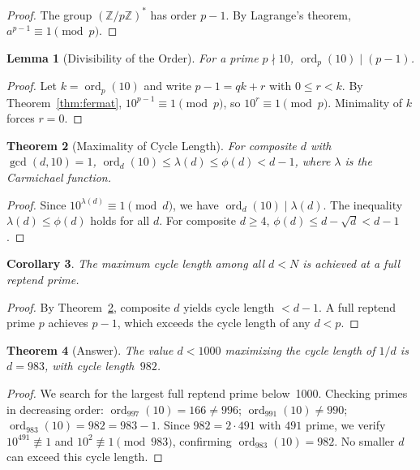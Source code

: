 \documentclass[12pt,a4paper]{article}
\newtheorem{theorem}{Theorem}
\newtheorem{lemma}[theorem]{Lemma}
\newtheorem{corollary}[theorem]{Corollary}
\theoremstyle{definition}
\begin{document}
\begin{proof}
The group $(\mathbb{Z}/p\mathbb{Z})^*$ has order $p - 1$. By Lagrange's theorem, $a^{p-1} \equiv 1 \pmod{p}$.
\end{proof}

\begin{lemma}[Divisibility of the Order]\label{lem:div}
For a prime $p \nmid 10$, $\operatorname{ord}_p(10) \mid (p - 1)$.
\end{lemma}

\begin{proof}
Let $k = \operatorname{ord}_p(10)$ and write $p - 1 = qk + r$ with $0 \leq r < k$. By Theorem~\ref{thm:fermat}, $10^{p-1} \equiv 1 \pmod{p}$, so $10^r \equiv 1 \pmod{p}$. Minimality of $k$ forces $r = 0$.
\end{proof}

\begin{theorem}[Maximality of Cycle Length]\label{thm:max}
For composite $d$ with $\gcd(d, 10) = 1$, $\operatorname{ord}_d(10) \leq \lambda(d) \leq \phi(d) < d - 1$, where $\lambda$ is the Carmichael function.
\end{theorem}

\begin{proof}
Since $10^{\lambda(d)} \equiv 1 \pmod{d}$, we have $\operatorname{ord}_d(10) \mid \lambda(d)$. The inequality $\lambda(d) \leq \phi(d)$ holds for all $d$. For composite $d \geq 4$, $\phi(d) \leq d - \sqrt{d} < d - 1$.
\end{proof}

\begin{corollary}\label{cor:prime}
The maximum cycle length among all $d < N$ is achieved at a full reptend prime.
\end{corollary}

\begin{proof}
By Theorem~\ref{thm:max}, composite $d$ yields cycle length $< d - 1$. A full reptend prime $p$ achieves $p - 1$, which exceeds the cycle length of any $d < p$.
\end{proof}

\begin{theorem}[Answer]\label{thm:answer}
The value $d < 1000$ maximizing the cycle length of $1/d$ is $d = 983$, with cycle length~$982$.
\end{theorem}

\begin{proof}
We search for the largest full reptend prime below~1000. Checking primes in decreasing order: $\operatorname{ord}_{997}(10) = 166 \neq 996$; $\operatorname{ord}_{991}(10) \neq 990$; $\operatorname{ord}_{983}(10) = 982 = 983 - 1$. Since $982 = 2 \cdot 491$ with $491$ prime, we verify $10^{491} \not\equiv 1$ and $10^{2} \not\equiv 1 \pmod{983}$, confirming $\operatorname{ord}_{983}(10) = 982$. No smaller $d$ can exceed this cycle length.
\end{proof}
\end{document}
